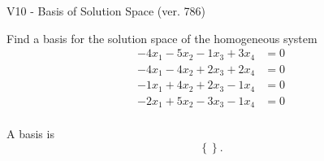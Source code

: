 \begin{exercise}
  \begin{exerciseTitle}V10 - Basis of Solution Space (ver. 786)\end{exerciseTitle}
  \begin{exerciseStatement}
    Find a basis for the solution space of the homogeneous system 
\begin{align*}
 -4 x_ 1 -5 x_ 2 -1 x_ 3 + 3 x_ 4 &= 0  \\ 
  -4 x_ 1 -4 x_ 2 + 2 x_ 3 + 2 x_ 4 &= 0  \\ 
  -1 x_ 1 + 4 x_ 2 + 2 x_ 3 -1 x_ 4 &= 0  \\ 
  -2 x_ 1 + 5 x_ 2 -3 x_ 3 -1 x_ 4 &= 0  \\ 
 \end{align*}


 
  \end{exerciseStatement}

  \begin{exerciseAnswer}
   A basis is   
\[\left\{\right\}.\]

  


  \end{exerciseAnswer}
\end{exercise}
